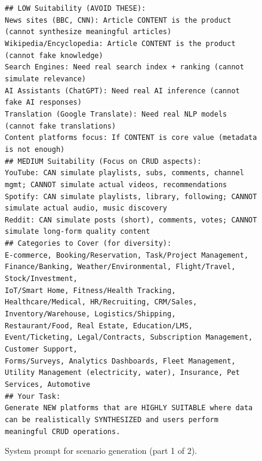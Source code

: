 \begin{figure}[p]
{\begin{minipage}{0.97\textwidth}
        \texttt{\#\# LOW Suitability (AVOID THESE):}\\
        \texttt{News sites (BBC, CNN): Article CONTENT is the product (cannot synthesize meaningful articles)}\\
        \texttt{Wikipedia/Encyclopedia: Article CONTENT is the product (cannot fake knowledge)}\\
        \texttt{Search Engines: Need real search index + ranking (cannot simulate relevance)}\\
        \texttt{AI Assistants (ChatGPT): Need real AI inference (cannot fake AI responses)}\\
        \texttt{Translation (Google Translate): Need real NLP models (cannot fake translations)}\\
        \texttt{Content platforms focus: If CONTENT is core value (metadata is not enough)}\\[4pt]

        \texttt{\#\# MEDIUM Suitability (Focus on CRUD aspects):}\\
        \texttt{YouTube: CAN simulate playlists, subs, comments, channel mgmt; CANNOT simulate actual videos, recommendations}\\
        \texttt{Spotify: CAN simulate playlists, library, following; CANNOT simulate actual audio, music discovery}\\
        \texttt{Reddit: CAN simulate posts (short), comments, votes; CANNOT simulate long-form quality content}\\[4pt]

        \texttt{\#\# Categories to Cover (for diversity):}\\
        \texttt{E-commerce, Booking/Reservation, Task/Project Management, Finance/Banking, Weather/Environmental, Flight/Travel, Stock/Investment,}\\
        \texttt{IoT/Smart Home, Fitness/Health Tracking, Healthcare/Medical, HR/Recruiting, CRM/Sales, Inventory/Warehouse, Logistics/Shipping,}\\
        \texttt{Restaurant/Food, Real Estate, Education/LMS, Event/Ticketing, Legal/Contracts, Subscription Management, Customer Support,}\\
        \texttt{Forms/Surveys, Analytics Dashboards, Fleet Management, Utility Management (electricity, water), Insurance, Pet Services, Automotive}\\[4pt]

        \texttt{\#\# Your Task:}\\
        \texttt{Generate NEW platforms that are HIGHLY SUITABLE where data can be realistically SYNTHESIZED and users perform meaningful CRUD operations.}

        \vspace{1pt}
        \end{minipage}
    }
    \captionsetup{labelformat=default, name=Figure}
    \caption{System prompt for scenario generation (part 1 of 2).}
    \label{fig:gen-scenario-system}
\end{figure}

